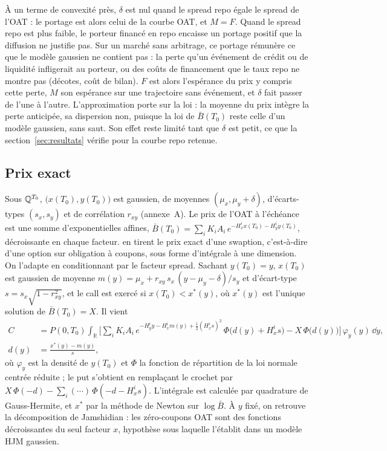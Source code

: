 À un terme de convexité près, $\delta$ est nul quand le spread repo égale le spread de l'OAT : le portage est
alors celui de la courbe OAT, et $M = F$. Quand le spread repo est plus faible, le porteur financé en repo
encaisse un portage positif que la diffusion ne justifie pas. Sur un marché sans arbitrage, ce portage rémunère
ce que le modèle gaussien ne contient pas : la perte qu'un événement de crédit ou de liquidité infligerait au
porteur, ou des coûts de financement que le taux repo ne montre pas (décotes, coût de bilan). $F$ est alors
l'espérance du prix y compris cette perte, $M$ son espérance sur une trajectoire sans événement, et $\delta$ fait
passer de l'une à l'autre. L'approximation porte sur la loi : la moyenne du prix intègre la perte anticipée, sa
dispersion non, puisque la loi de $\bar B(T_0)$ reste celle d'un modèle gaussien, sans saut. Son effet reste limité tant que
$\delta$ est petit, ce que la section~\ref{sec:resultats} vérifie pour la courbe repo retenue.

\subsection{Prix exact}

Sous $\mathbb{Q}^{T_0}$, $\big(x(T_0), y(T_0)\big)$ est gaussien, de moyennes $(\mu_x, \mu_y + \delta)$, d'écarts-types
$(s_x, s_y)$ et de corrélation $r_{xy}$ (annexe~A). Le prix de l'OAT à l'échéance est une somme d'exponentielles
affines, $\bar B(T_0) = \sum_i K_iA_i\,e^{-H_x^i x(T_0) - H_y^i y(T_0)}$, décroissante en chaque facteur.
\citet[théorème~4.2.3]{BrigoMercurio2006} en tirent le prix exact d'une swaption, c'est-à-dire d'une option sur
obligation à coupons, sous forme d'intégrale à une dimension. On l'adapte en conditionnant par le facteur spread.
Sachant $y(T_0) = y$, $x(T_0)$ est gaussien de moyenne $m(y) = \mu_x + r_{xy}\,s_x\,(y - \mu_y - \delta)/s_y$ et
d'écart-type $s = s_x\sqrt{1 - r_{xy}^2}$, et le call est exercé si $x(T_0) < x^\ast(y)$, où $x^\ast(y)$ est
l'unique solution de $\bar B(T_0) = X$. Il vient
\begin{equation}
\begin{split}
C &= P(0,T_0)\int_{\mathbb R}\Big[\sum_i K_iA_i\,e^{-H_y^i y - H_x^i m(y) + \frac12 (H_x^i s)^2}\,\Phi\big(d(y) + H_x^i s\big)
- X\,\Phi\big(d(y)\big)\Big]\,\varphi_y(y)\,\dd y,\\
d(y) &= \frac{x^\ast(y) - m(y)}{s},
\end{split}
\label{eq:prix_exact}
\end{equation}
où $\varphi_y$ est la densité de $y(T_0)$ et $\Phi$ la fonction de répartition de la loi normale centrée réduite ;
le put s'obtient en remplaçant le crochet par $X\,\Phi(-d) - \sum_i(\cdots)\,\Phi(-d - H_x^i s)$. L'intégrale est
calculée par quadrature de Gauss-Hermite, et $x^\ast$ par la méthode de Newton sur $\log\bar B$. À $y$ fixé, on
retrouve la décomposition de Jamshidian : les zéro-coupons OAT sont des fonctions décroissantes du seul facteur
$x$, hypothèse sous laquelle \citet[CM3, p.~40-43]{Hillairet2026} l'établit dans un modèle HJM gaussien.

